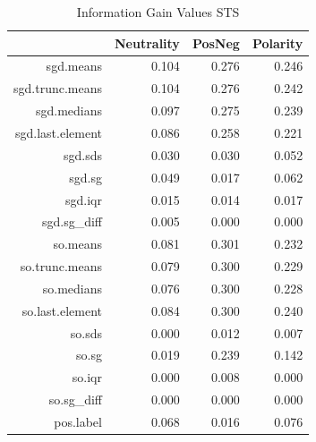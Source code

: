 \documentclass{sig-alternate}
\begin{document}
\begin{table}[ht]
\centering
\begin{tabular}{rrrr}
  \hline
 & Neutrality & PosNeg & Polarity \\ 
  \hline
sgd.means & 0.104 & 0.276 & 0.246 \\ 
  sgd.trunc.means & 0.104 & 0.276 & 0.242 \\ 
  sgd.medians & 0.097 & 0.275 & 0.239 \\ 
  sgd.last.element & 0.086 & 0.258 & 0.221 \\ 
  sgd.sds & 0.030 & 0.030 & 0.052 \\ 
  sgd.sg & 0.049 & 0.017 & 0.062 \\ 
  sgd.iqr & 0.015 & 0.014 & 0.017 \\ 
  sgd.sg\_diff & 0.005 & 0.000 & 0.000 \\ 
  so.means & 0.081 & 0.301 & 0.232 \\ 
  so.trunc.means & 0.079 & 0.300 & 0.229 \\ 
  so.medians & 0.076 & 0.300 & 0.228 \\ 
  so.last.element & 0.084 & 0.300 & 0.240 \\ 
  so.sds & 0.000 & 0.012 & 0.007 \\ 
  so.sg & 0.019 & 0.239 & 0.142 \\ 
  so.iqr & 0.000 & 0.008 & 0.000 \\ 
  so.sg\_diff & 0.000 & 0.000 & 0.000 \\ 
  pos.label & 0.068 & 0.016 & 0.076 \\ 
   \hline
\end{tabular}
\caption{Information Gain Values STS} 
\end{table}
\end{document}
